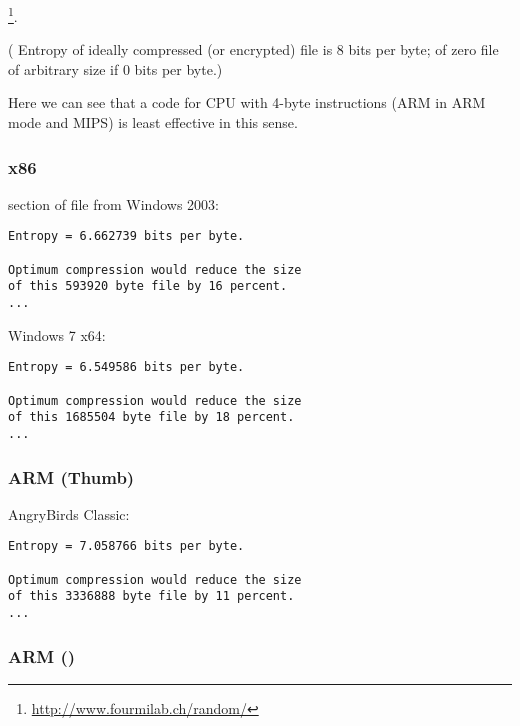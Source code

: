 \footnote{\url{http://www.fourmilab.ch/random/}}.

(
{Entropy of ideally compressed (or encrypted) file is 8 bits per byte; of zero file of arbitrary size if 0 bits per byte.})

{Here we can see that a code for CPU with 4-byte instructions (ARM in ARM mode and MIPS) is least effective in this sense.}

\subsubsection{x86}

{ section of  file from} Windows 2003:

\begin{lstlisting}
Entropy = 6.662739 bits per byte.

Optimum compression would reduce the size
of this 593920 byte file by 16 percent.
...
\end{lstlisting}

   Windows 7 x64:

\begin{lstlisting}
Entropy = 6.549586 bits per byte.

Optimum compression would reduce the size
of this 1685504 byte file by 18 percent.
...
\end{lstlisting}

\subsubsection{ARM (Thumb)}

AngryBirds Classic:

\begin{lstlisting}
Entropy = 7.058766 bits per byte.

Optimum compression would reduce the size
of this 3336888 byte file by 11 percent.
...
\end{lstlisting}

\subsubsection{ARM ()}

